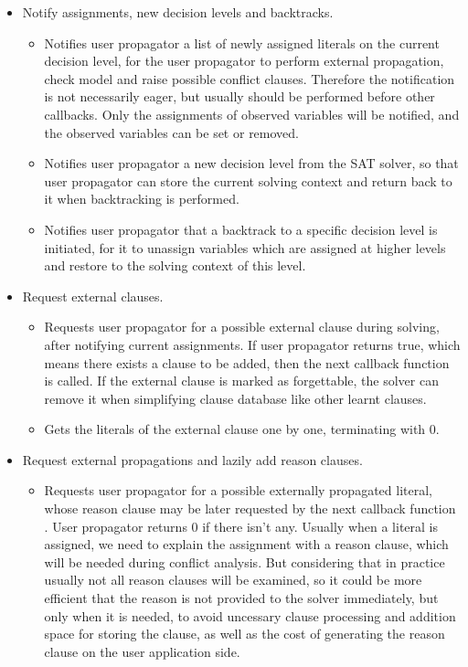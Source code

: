 \begin{itemize}
  \item Notify assignments, new decision levels and backtracks.
    \begin{itemize}
      \item {} Notifies user propagator a list of newly assigned literals on the current decision level, for the user propagator to perform external propagation, check model and raise possible conflict clauses. Therefore the notification is not necessarily eager, but usually should be performed before other callbacks. Only the assignments of observed variables will be notified, and the observed variables can be set or removed.
      \item {} Notifies user propagator a new decision level from the SAT solver, so that user propagator can store the current solving context and return back to it when backtracking is performed.
      \item {} Notifies user propagator that a backtrack to a specific decision level is initiated, for it to unassign variables which are assigned at higher levels and restore to the solving context of this level.
    \end{itemize}
  \item Request external clauses.
    \begin{itemize}
      \item {} Requests user propagator for a possible external clause during solving, after notifying current assignments. If user propagator returns true, which means there exists a clause to be added, then the next callback function  is called. If the external clause is marked as forgettable, the solver can remove it when simplifying clause database like other learnt clauses.
      \item {} Gets the literals of the external clause one by one, terminating with 0.  
    \end{itemize}
  \item Request external propagations and lazily add reason clauses.
    \begin{itemize}
      \item {} Requests user propagator for a possible externally propagated literal, whose reason clause may be later requested by the next callback function . User propagator returns 0 if there isn't any. Usually when a literal is assigned, we need to explain the assignment with a reason clause, which will be needed during conflict analysis. But considering that in practice usually not all reason clauses will be examined, so it could be more efficient that the reason is not provided to the solver immediately, but only when it is needed, to avoid uncessary clause processing and addition space for storing the clause, as well as the cost of generating the reason clause on the user application side.

\end{itemize}
\end{itemize}
